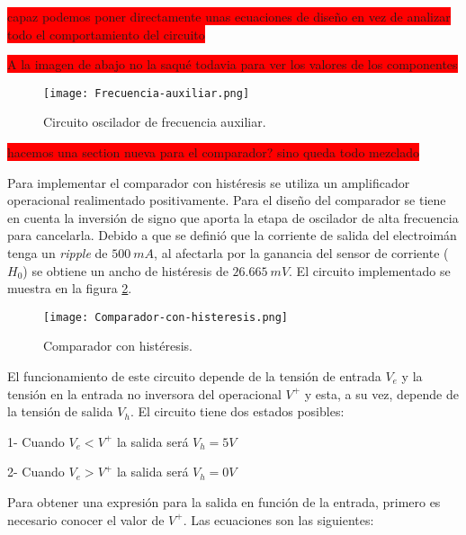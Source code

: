 \colorbox{red}{capaz podemos poner directamente unas ecuaciones de diseño en vez de analizar todo el comportamiento del circuito}

%



\colorbox{red}{A la imagen de abajo no la saqué todavia para ver los valores de los componentes}
\begin{figure}[H]
	\centering
	\texttt{[image: Frecuencia-auxiliar.png]}
	\caption{Circuito oscilador de frecuencia auxiliar.}
	\label{fig:img_frecuencia-auxiliarasdas}
\end{figure}


\colorbox{red}{hacemos una section nueva para el comparador? sino queda todo mezclado}

Para implementar el comparador con histéresis se utiliza un amplificador operacional realimentado positivamente. Para el diseño del comparador se tiene en cuenta la inversión de signo que aporta la etapa de oscilador de alta frecuencia para cancelarla. Debido a que se definió que la corriente de salida del electroimán tenga un \textsl{ripple} de $500\:mA$, al afectarla por la ganancia del sensor de corriente ($H_0$) se obtiene un ancho de histéresis de $26.665\:mV$. El circuito implementado se muestra en la figura \ref{fig:img_comp-con-hist}.

\begin{figure}[H]
	\centering
	\texttt{[image: Comparador-con-histeresis.png]}
	\caption{Comparador con histéresis.}
	\label{fig:img_comp-con-hist}
\end{figure}

El funcionamiento de este circuito depende de la tensión de entrada $V_e$ y la tensión en la entrada no inversora del operacional $V^+$ y esta, a su vez, depende de la tensión de salida $V_h$. El circuito tiene dos estados posibles:

1- Cuando $V_e<V^+$ la salida será $V_h=5V$

2- Cuando $V_e>V^+$ la salida será $V_h=0V$

Para obtener una expresión para la salida en función de la entrada, primero es necesario conocer el valor de $V^+$.
Las ecuaciones son las siguientes:

